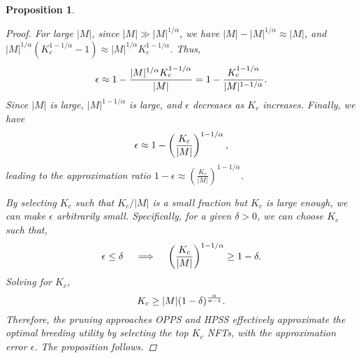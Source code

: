\documentclass[conference]{IEEEtran}
\newcommand{\1}[1]{\mathds{1}\left[#1\right]}
\theoremstyle{plain}
\newtheorem{proposition}{Proposition}
\newcommand{\homos}{OPPS\xspace}
\newcommand{\heters}{HPSS\xspace}
\begin{document}
\begin{proposition}
{\begin{proof}
For large $|M|$, since $|M| \gg |M|^{1/\alpha}$, we have $|M| - |M|^{1/\alpha} \approx |M|$, and $ |M|^{1/\alpha} \left( K_c^{1 - 1/\alpha} - 1 \right) \approx |M|^{1/\alpha} K_c^{1 - 1/\alpha}$. Thus,
\begin{equation}\small
    \epsilon \approx 1 - \frac{|M|^{1/\alpha} K_c^{1 - 1/\alpha}}{|M|} = 1 - \frac{K_c^{1 - 1/\alpha}}{|M|^{1 - 1/\alpha}}.
\end{equation}
Since $|M|$ is large, $|M|^{1 - 1/\alpha}$ is large, and $\epsilon$ decreases as $K_c$ increases. 
Finally, we have
\begin{equation}\small
    \epsilon \approx 1 - \left( \frac{K_c}{|M|} \right)^{1 - 1/\alpha},
\end{equation}
leading to the approximation ratio $1 - \epsilon \approx \left( \frac{K_c}{|M|} \right)^{1 - 1/\alpha}$.

By selecting $K_c$ such that $K_c/|M|$ is a small fraction but $K_c$ is large enough, we can make $\epsilon$ arbitrarily small. Specifically, for a given $\delta > 0$, we can choose $K_c$ such that,
\begin{equation}\small
    \epsilon \leq \delta \quad \implies \quad \left( \frac{K_c}{|M|} \right)^{1 - 1/\alpha} \geq 1 - \delta.
\end{equation}
Solving for $K_c$,
\begin{equation}\small
    K_c \geq |M| (1 - \delta)^{\frac{\alpha}{\alpha - 1}}.
\end{equation}
Therefore, the pruning approaches \homos and \heters effectively approximate the optimal breeding utility by selecting the top $K_c$ NFTs, with the approximation error $\epsilon$. The proposition follows.


    \end{proof}
    }
\end{proposition}
\end{document}
